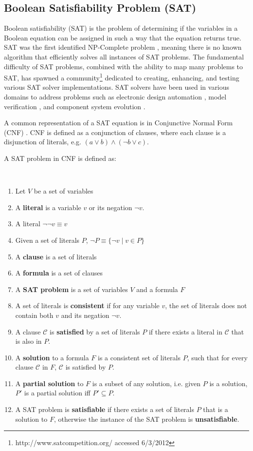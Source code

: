 \subsection{Boolean Satisfiability Problem (SAT)}
Boolean satisfiability (SAT)  is the problem of determining if the variables in a Boolean equation can be assigned in such a way that the equation returns true.
SAT was the first identified NP-Complete problem \cite{cook1971}, meaning there is no known algorithm that efficiently solves all instances of SAT problems.
The fundamental difficulty of SAT problems, 
combined with the ability to map many problems to SAT, has spawned a community\footnote{http://www.satcompetition.org/ accessed 6/3/2012} 
dedicated to creating, enhancing, and testing various SAT solver implementations. 
SAT solvers have been used in various domains to address problems such as electronic design automation \citep{Marques-Silva2000}, 
model verification \citep{dennis2006}, and component system evolution \citep{leBerre2010}.

A common representation of a SAT equation is in Conjunctive Normal Form (CNF) \cite{Moskewicz2001}.
CNF is defined as a conjunction of clauses, 
where each clause is a disjunction of literals, e.g. $(a \vee b) \wedge (\neg b \vee c)$.

A SAT problem in CNF is defined as:
\begin{defs}
\label{impl.defSAT}
{\ }
\begin{enumerate}
    \item Let $V$ be a set of variables
    \item A \textbf{literal} is a variable $v$ or its negation $\neg v$.
    \item A literal $\neg \neg v \equiv v$
    \item Given a set of literals $P$, $\neg P \equiv \{\neg v \mid v \in P\}$
    \item A \textbf{clause} is a set of literals 
    \item A \textbf{formula} is a set of clauses \label{impl.whatisaformula}
    \item A \textbf{SAT problem} is a set of variables $V$ and a formula $F$
    \item A set of literals is \textbf{consistent} if for any variable $v$, the set of literals does not contain both $v$ and its negation $\neg v$.
    \item A clause $\mathcal{C}$ is \textbf{satisfied} by a set of literals $P$ if there exists a literal in $\mathcal{C}$ that is also in $P$.
    \item A \textbf{solution} to a formula $F$ is a consistent set of literals $P$, such that for every clause $\mathcal{C}$ in $F$, $\mathcal{C}$ is satisfied by $P$.
    \item A \textbf{partial solution} to $F$ is a subset of any solution, i.e. given $P$ is a solution, $P'$ is a partial solution iff $P' \subseteq P$.
    \item A SAT problem is \textbf{satisfiable} if there exists a set of literals $P$ that is a solution to $F$, otherwise the instance of the SAT problem is \textbf{unsatisfiable}. 
\end{enumerate}
\end{defs}


